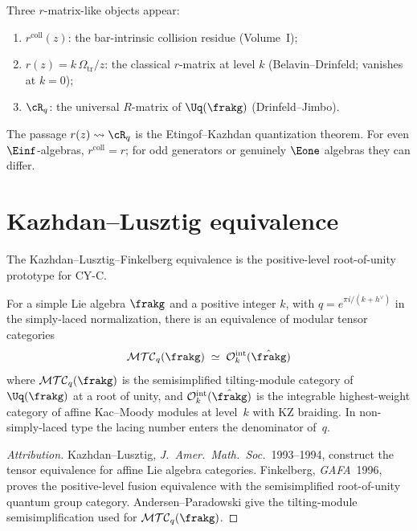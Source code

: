 \begin{remark}
\label{rem:three-r-matrices-qg}
Three $r$-matrix-like objects appear:
\begin{enumerate}[label=(\alph*)]
 \item $r^{\mathrm{coll}}(z)$: the bar-intrinsic collision residue
 (Volume~I);
 \item $r(z) = k\,\Omega_{\mathrm{tr}}/z$: the classical $r$-matrix at level $k$
 (Belavin--Drinfeld; vanishes at $k = 0$);
 \item $\cR_q$: the universal $R$-matrix of $\Uq(\frakg)$
 (Drinfeld--Jimbo).
\end{enumerate}
The passage $r(z) \rightsquigarrow \cR_q$ is the Etingof--Kazhdan
quantization theorem. For even $\Einf$-algebras,
$r^{\mathrm{coll}} = r$; for odd generators or genuinely $\Eone$
algebras they can differ.
\end{remark}


\section{Kazhdan--Lusztig equivalence}
\label{sec:kl-equivalence}

The Kazhdan--Lusztig--Finkelberg equivalence is the positive-level
root-of-unity prototype for CY-C.

\begin{theorem}
\label{thm:kl-equivalence}
For a simple Lie algebra $\frakg$ and a positive integer $k$, with
$q = e^{\pi i/(k+h^\vee)}$ in the simply-laced normalization, there
is an equivalence of modular tensor categories
\[
 \mathcal{MTC}_q(\frakg) \;\simeq\; \mathcal{O}^{\mathrm{int}}_k(\hat{\frakg})
\]
where $\mathcal{MTC}_q(\frakg)$ is the semisimplified tilting-module
category of $\Uq(\frakg)$ at a root of unity, and
$\mathcal{O}^{\mathrm{int}}_k(\hat{\frakg})$ is the integrable
highest-weight category of affine Kac--Moody modules at level~$k$
with KZ braiding. In non-simply-laced type the lacing number enters
the denominator of~$q$.
\end{theorem}

\begin{proof}[Attribution]
Kazhdan--Lusztig, \emph{J.\ Amer.\ Math.\ Soc.}~1993--1994, construct
the tensor equivalence for affine Lie algebra categories. Finkelberg,
\emph{GAFA}~1996, proves the positive-level fusion equivalence with the
semisimplified root-of-unity quantum group category. Andersen--Paradowski
give the tilting-module semisimplification used for
$\mathcal{MTC}_q(\frakg)$.
\end{proof}

